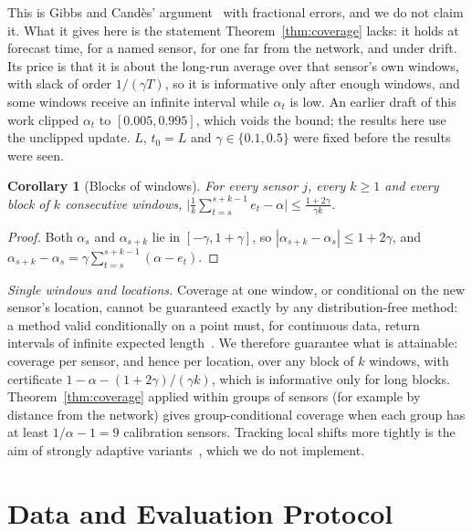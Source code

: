 \documentclass[journal,twoside,web]{ieeecolor}
\newtheorem{corollary}{Corollary}
\begin{document}
This is Gibbs and Cand\`es' argument~\cite{gibbs2021aci} with fractional errors, and we do not claim it.
What it gives here is the statement Theorem~\ref{thm:coverage} lacks: it holds at forecast time, for a
named sensor, for one far from the network, and under drift. Its price is that it is about the long-run
average over that sensor's own windows, with slack of order $1/(\gamma T)$, so it is informative only
after enough windows, and some windows receive an infinite interval while $\alpha_t$ is low. An earlier
draft of this work clipped $\alpha_t$ to $[0.005,0.995]$, which voids the bound; the results here use the
unclipped update. $L$, $t_0=L$ and $\gamma\in\{0.1,0.5\}$ were fixed before the results were seen.
\begin{corollary}[Blocks of windows]
\label{cor:block}
For every sensor $j$, every $k\ge1$ and every block of $k$ consecutive windows,
$\big|\frac1k\sum_{t=s}^{s+k-1}e_t-\alpha\big|\le\frac{1+2\gamma}{\gamma k}$.
\end{corollary}
\begin{proof}
Both $\alpha_s$ and $\alpha_{s+k}$ lie in $[-\gamma,1+\gamma]$, so $|\alpha_{s+k}-\alpha_s|\le1+2\gamma$, and
$\alpha_{s+k}-\alpha_s=\gamma\sum_{t=s}^{s+k-1}(\alpha-e_t)$. \end{proof}
\emph{Single windows and locations.} Coverage at one window, or conditional on the new sensor's location, cannot
be guaranteed exactly by any distribution-free method: a method valid conditionally on a point must, for
continuous data, return intervals of infinite expected length~\cite{vovk2012conditional,lei2014distribution,barber2021limits}.
We therefore guarantee what is attainable: coverage per sensor, and hence per location, over any block of $k$
windows, with certificate $1-\alpha-(1+2\gamma)/(\gamma k)$, which is informative only for long blocks.
Theorem~\ref{thm:coverage} applied within groups of sensors (for example by distance from the network) gives
group-conditional coverage when each group has at least $1/\alpha-1=9$ calibration sensors. Tracking local
shifts more tightly is the aim of strongly adaptive variants~\cite{gibbs2024dtaci}, which we do not implement.

\section{Data and Evaluation Protocol}
\label{sec:experiments}
\end{document}
